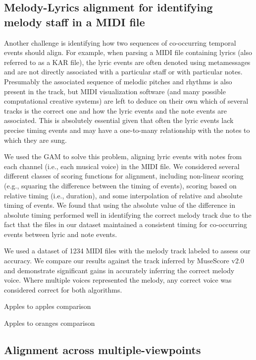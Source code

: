 \documentclass[12pt]{article}
\begin{document}
\subsection{Melody-Lyrics alignment for identifying melody staff in a MIDI file}

Another challenge is identifying how two sequences of co-occurring temporal events should align. For example, when parsing a MIDI file containing lyrics (also referred to as a KAR file), the lyric events are often denoted using metamessages and are not directly associated with a particular staff or with particular notes. Presumably the associated sequence of melodic pitches and rhythms is also present in the track, but MIDI visualization software (and many possible computational creative systems) are left to deduce on their own which of several tracks is the correct one and how the lyric events and the note events are associated. This is absolutely essential given that often the lyric events lack precise timing events and may have a one-to-many relationship with the notes to which they are sung.

We used the GAM to solve this problem, aligning lyric events with notes from each channel (i.e., each musical voice) in the MIDI file. We considered several different classes of scoring functions for alignment, including non-linear scoring (e.g., squaring the difference between the timing of events), scoring based on relative timing (i.e., duration), and some interpolation of relative and absolute timing of events. We found that using the absolute value of the difference in absolute timing performed well in identifying the correct melody track due to the fact that the files in our dataset maintained a consistent timing for co-occurring events between lyric and note events.

We used a dataset of 1234 MIDI files with the melody track labeled to assess our accuracy. We compare our results against the track inferred by MuseScore v2.0 and demonstrate significant gains in accurately inferring the correct melody voice. Where multiple voices represented the melody, any correct voice was considered correct for both algorithms.

Apples to apples comparison

Apples to oranges comparison

\subsection{Alignment across multiple-viewpoints}
\end{document}
